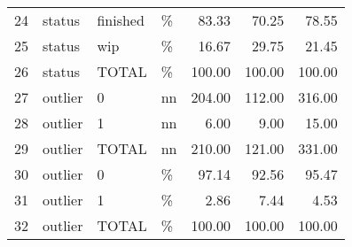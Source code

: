 \begin{sidewaystable}[ht]
\begin{tabular}{rlllrrr}
  24 & status & finished & \% & 83.33 & 70.25 & 78.55 \\ 
  25 & status & wip & \% & 16.67 & 29.75 & 21.45 \\ 
  26 & status & TOTAL & \% & 100.00 & 100.00 & 100.00 \\ 
  27 & outlier & 0 & nn & 204.00 & 112.00 & 316.00 \\ 
  28 & outlier & 1 & nn & 6.00 & 9.00 & 15.00 \\ 
  29 & outlier & TOTAL & nn & 210.00 & 121.00 & 331.00 \\ 
  30 & outlier & 0 & \% & 97.14 & 92.56 & 95.47 \\ 
  31 & outlier & 1 & \% & 2.86 & 7.44 & 4.53 \\ 
  32 & outlier & TOTAL & \% & 100.00 & 100.00 & 100.00 \\ 
   \hline
\end{tabular}
\end{sidewaystable}
